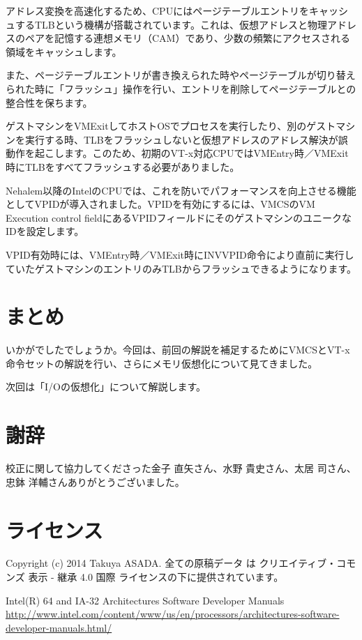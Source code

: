 アドレス変換を高速化するため、CPUにはページテーブルエントリをキャッシュするTLBという機構が搭載されています。これは、仮想アドレスと物理アドレスのペアを記憶する連想メモリ（CAM）であり、少数の頻繁にアクセスされる領域をキャッシュします。

また、ページテーブルエントリが書き換えられた時やページテーブルが切り替えられた時に「フラッシュ」操作を行い、エントリを削除してページテーブルとの整合性を保ちます。

ゲストマシンをVMExitしてホストOSでプロセスを実行したり、別のゲストマシンを実行する時、TLBをフラッシュしないと仮想アドレスのアドレス解決が誤動作を起こします。このため、初期のVT-x対応CPUではVMEntry時／VMExit時にTLBをすべてフラッシュする必要がありました。

Nehalem以降のIntelのCPUでは、これを防いでパフォーマンスを向上させる機能としてVPIDが導入されました。VPIDを有効にするには、VMCSのVM Execution control fieldにあるVPIDフィールドにそのゲストマシンのユニークなIDを設定します。

VPID有効時には、VMEntry時／VMExit時にINVVPID命令により直前に実行していたゲストマシンのエントリのみTLBからフラッシュできるようになります。

\section{まとめ}
いかがでしたでしょうか。今回は、前回の解説を補足するためにVMCSとVT-x命令セットの解説を行い、さらにメモリ仮想化について見てきました。

次回は「I/Oの仮想化」について解説します。

\section{謝辞}
校正に関して協力してくださった金子 直矢さん、水野 貴史さん、太居 司さん、忠鉢 洋輔さんありがとうございました。

\section{ライセンス}
Copyright (c) 2014 Takuya ASADA.
全ての原稿データ は クリエイティブ・コモンズ 表示 - 継承 4.0 国際 ライセンスの下に提供されています。

\begin{thebibliography}{4}
   Intel(R) 64 and IA-32 Architectures Software Developer Manuals \url{http://www.intel.com/content/www/us/en/processors/architectures-software-developer-manuals.html/}
\end{thebibliography}


